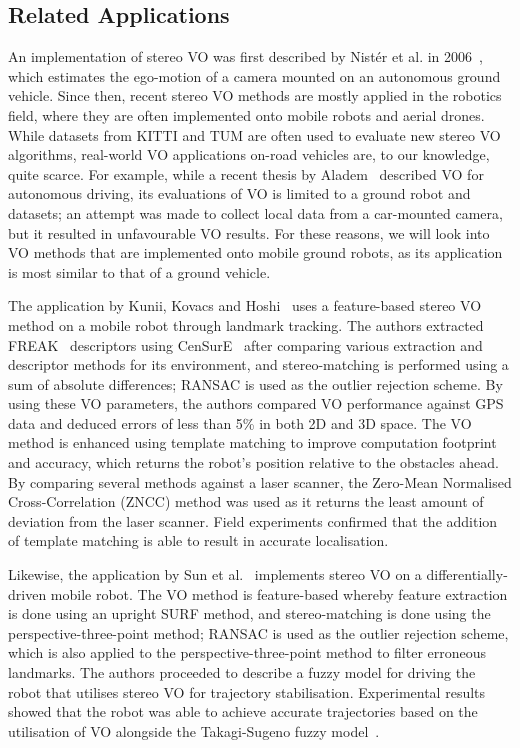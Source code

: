 \subsection{Related Applications}
An implementation of stereo VO was first described by Nistér et al. in 2006~\cite{nister_visual_2006}, which estimates the ego-motion of a camera mounted on an autonomous ground vehicle. Since then, recent stereo VO methods are mostly applied in the robotics field, where they are often implemented onto mobile robots and aerial drones. While datasets from KITTI and TUM are often used to evaluate new stereo VO algorithms, real-world VO applications on-road vehicles are, to our knowledge, quite scarce. For example, while a recent thesis by Aladem~\cite{aladem_robust_2017} described VO for autonomous driving, its evaluations of VO is limited to a ground robot and datasets; an attempt was made to collect local data from a car-mounted camera, but it resulted in unfavourable VO results. For these reasons, we will look into VO methods that are implemented onto mobile ground robots, as its application is most similar to that of a ground vehicle. 

The application by Kunii, Kovacs and Hoshi~\cite{kunii_mobile_2017} uses a feature-based stereo VO method on a mobile robot through landmark tracking. The authors extracted FREAK~\cite{alahi_freak:_2012} descriptors using CenSurE~\cite{agrawal_censure:_2008} after comparing various extraction and descriptor methods for its environment, and stereo-matching is performed using a sum of absolute differences; RANSAC is used as the outlier rejection scheme. By using these VO parameters, the authors compared VO performance against GPS data and deduced errors of less than 5\% in both 2D and 3D space. The VO method is enhanced using template matching to improve computation footprint and accuracy, which returns the robot's position relative to the obstacles ahead. By comparing several methods against a laser scanner, the Zero-Mean Normalised Cross-Correlation (ZNCC) method was used as it returns the least amount of deviation from the laser scanner. Field experiments confirmed that the addition of template matching is able to result in accurate localisation. 


Likewise, the application by Sun et al.~\cite{sun_sequentially_2017} implements stereo VO on a differentially-driven mobile robot. The VO method is feature-based whereby feature extraction is done using an upright SURF method, and stereo-matching is done using the perspective-three-point method; RANSAC is used as the outlier rejection scheme, which is also applied to the perspective-three-point method to filter erroneous landmarks. The authors proceeded to describe a fuzzy model for driving the robot that utilises stereo VO for trajectory stabilisation. Experimental results showed that the robot was able to achieve accurate trajectories based on the utilisation of VO alongside the Takagi-Sugeno fuzzy model~\cite{takagi_fuzzy_1985}.

